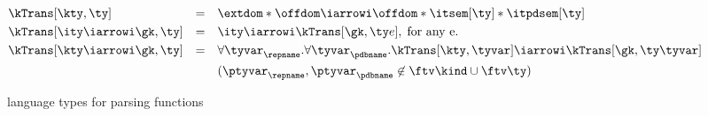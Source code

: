 




\begin{figure}
\small
\fbox{$\kTrans[\gk,\ty] = \ity$} 
    
\begin{align*}
  &\kTrans[\kty,\ty] & = & \quad \extdom * \offdom \iarrowi \offdom * \itsem[\ty] * \itpdsem[\ty]
   \\
   &\kTrans[\ity \iarrowi \gk,\ty] & = & \quad \ity \iarrowi \kTrans[\gk,\ty e],
   \; \mbox{for any e}.
   \\
   &\kTrans[\kty \iarrowi \gk,\ty] & = & \quad 
      \forall\tyvar_\repname.\forall\tyvar_\pdbname.
         \kTrans[\kty,\tyvar] \iarrowi \kTrans[\gk,\ty \tyvar] \\
         & & & \quad (\ptyvar_\repname, \ptyvar_\pdbname \not \in \ftv \kind \cup
         \ftv \ty)
\end{align*}  
  \caption{\Implang{} language types for parsing functions}
  \label{fig:parser-types}
\end{figure}


